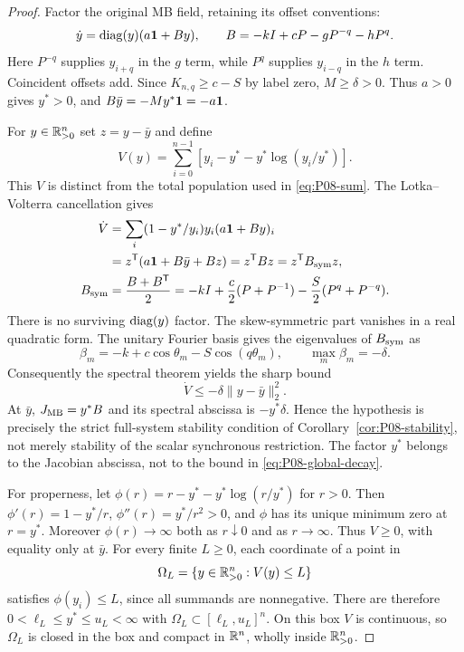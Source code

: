 \begin{proof}
Factor the original MB field, retaining its offset conventions:
\begin{equation}
 \dot y=\operatorname{diag}(y)(a\mathbf{1}+By),\qquad
 B=-kI+cP-gP^{-q}-hP^q.
 \label{eq:P08-global-field}
\end{equation}
Here $P^{-q}$ supplies $y_{i+q}$ in the $g$ term, while $P^q$
supplies $y_{i-q}$ in the $h$ term. Coincident offsets add.
Since $K_{n,q}\ge c-S$ by label zero, $M\ge\delta>0$.
Thus $a>0$ gives $y^*>0$, and
$B\bar y=-My^*\mathbf{1}=-a\mathbf{1}$.

For $y\in\mathbb{R}_{>0}^{n}$ set $z=y-\bar y$ and define
\begin{equation}
 V(y)=\sum_{i=0}^{n-1}\left[y_i-y^*-y^*\log(y_i/y^*)\right].
 \label{eq:P08-global-V}
\end{equation}
This $V$ is distinct from the total population used in
\eqref{eq:P08-sum}. The Lotka--Volterra cancellation gives
\begin{align}
 \dot V
 &=\sum_i(1-y^*/y_i)y_i(a\mathbf{1}+By)_i\nonumber\\
 &=z^{\mathsf T}(a\mathbf{1}+B\bar y+Bz)
 =z^{\mathsf T}Bz=z^{\mathsf T}B_{\rm sym}z,
 \label{eq:P08-global-cancellation}\\
 B_{\rm sym}&=\frac{B+B^{\mathsf T}}2
 =-kI+\frac c2(P+P^{-1})-\frac S2(P^q+P^{-q}).\nonumber
\end{align}
There is no surviving $\operatorname{diag}(y)$ factor. The skew-symmetric part
vanishes in a real quadratic form. The unitary Fourier basis gives
the eigenvalues of $B_{\rm sym}$ as
\[
 \beta_m=-k+c\cos\theta_m-S\cos(q\theta_m),\qquad
 \max_m\beta_m=-\delta.
\]
Consequently the spectral theorem yields the sharp bound
\begin{equation}
 \dot V\le-\delta\|y-\bar y\|_2^2.
 \label{eq:P08-global-decay}
\end{equation}
At $\bar y$, $J_{\mathrm{MB}}=y^*B$ and its spectral abscissa is
$-y^*\delta$. Hence the hypothesis is precisely the strict full-system
stability condition of Corollary~\ref{cor:P08-stability}, not merely
stability of the scalar synchronous restriction. The factor $y^*$
belongs to the Jacobian abscissa, not to the bound in
\eqref{eq:P08-global-decay}.

For properness, let $\phi(r)=r-y^*-y^*\log(r/y^*)$ for $r>0$.
Then $\phi'(r)=1-y^*/r$, $\phi''(r)=y^*/r^2>0$, and $\phi$ has
its unique minimum zero at $r=y^*$. Moreover $\phi(r)\to\infty$
both as $r\downarrow0$ and as $r\to\infty$. Thus $V\ge0$, with
equality only at $\bar y$. For every finite $L\ge0$, each coordinate
of a point in
\[
 \Omega_L=\{y\in\mathbb{R}_{>0}^{n}:V(y)\le L\}
\]
satisfies $\phi(y_i)\le L$, since all summands are nonnegative.
There are therefore $0<\ell_L\le y^*\le u_L<\infty$ with
$\Omega_L\subset[\ell_L,u_L]^n$. On this box $V$ is continuous,
so $\Omega_L$ is closed in the box and compact in $\mathbb{R}^n$, wholly
inside $\mathbb{R}_{>0}^{n}$.


\end{proof}
